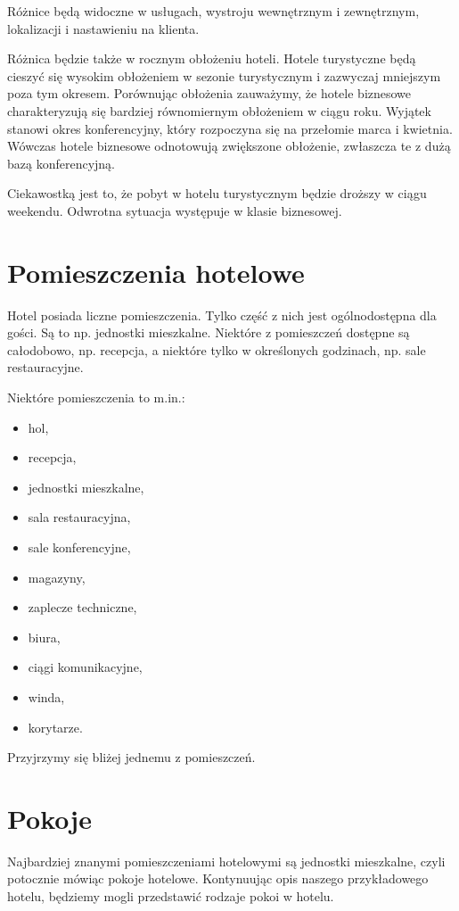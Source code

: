 \documentclass[a4paper,onecolumn,oneside,11pt,wide,floatssmall]{mwrep}
\theoremstyle{definition}
\theoremstyle{plain}%
\theoremstyle{remark}
\begin{document}
Różnice będą widoczne w usługach, wystroju wewnętrznym i zewnętrznym, 
lokalizacji i nastawieniu na klienta.

Różnica będzie także w rocznym obłożeniu hoteli. Hotele turystyczne będą 
cieszyć się wysokim obłożeniem w sezonie turystycznym i zazwyczaj 
mniejszym poza tym okresem. Porównując obłożenia zauważymy, że hotele biznesowe 
charakteryzują się bardziej równomiernym obłożeniem w ciągu roku. 
Wyjątek stanowi okres konferencyjny, który rozpoczyna się na przełomie 
marca i kwietnia. Wówczas hotele biznesowe odnotowują zwiększone obłożenie,
 zwłaszcza te z dużą bazą konferencyjną.

Ciekawostką jest to, że pobyt w hotelu turystycznym będzie droższy w ciągu 
weekendu. Odwrotna sytuacja występuje w klasie biznesowej.

\section{Pomieszczenia hotelowe}
Hotel posiada liczne pomieszczenia. Tylko część z nich jest ogólnodostępna 
dla gości. Są to np. jednostki mieszkalne. Niektóre z pomieszczeń dostępne są całodobowo, np. recepcja, a niektóre tylko w określonych godzinach, np. sale restauracyjne.

Niektóre pomieszczenia to m.in.:
\begin{itemize}
\item hol,
\item recepcja,
\item jednostki mieszkalne,
\item sala restauracyjna,
\item sale konferencyjne,
\item magazyny,
\item zaplecze techniczne,
\item biura,
\item ciągi komunikacyjne,
\item winda,
\item korytarze.
\end{itemize}

Przyjrzymy się bliżej jednemu z pomieszczeń.

\section{Pokoje}
Najbardziej znanymi pomieszczeniami hotelowymi są jednostki mieszkalne, czyli 
potocznie mówiąc pokoje hotelowe. Kontynuując opis naszego przykładowego 
hotelu, będziemy mogli przedstawić rodzaje pokoi w hotelu.
\end{document}
